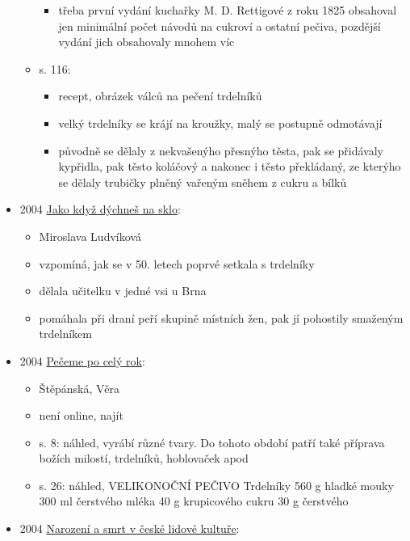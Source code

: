 \begin{itemize}
\begin{itemize}
    \begin{itemize}
    \tightlist
    \item
      třeba první vydání kuchařky M. D. Rettigové z roku 1825 obsahoval
      jen minimální počet návodů na cukroví a ostatní pečiva, pozdější
      vydání jich obsahovaly mnohem víc
    \end{itemize}
  \item
    s. 116:

    \begin{itemize}
    \tightlist
    \item
      recept, obrázek válců na pečení trdelníků
    \item
      velký trdelníky se krájí na kroužky, malý se postupně odmotávají
    \item
      původně se dělaly z nekvašenýho přesnýho těsta, pak se přidávaly
      kypřidla, pak těsto koláčový a nakonec i těsto překládaný, ze
      kterýho se dělaly trubičky plněný vařeným sněhem z cukru a bílků
    \end{itemize}
  \end{itemize}
\item
  2004
  \href{https://ceskadigitalniknihovna.cz/uuid/uuid:8ad90ef0-1c91-11ed-bb16-005056827e52}{Jako
  když dýchneš na sklo}:

  \begin{itemize}
  \tightlist
  \item
    Miroslava Ludvíková
  \item
    vzpomíná, jak se v 50. letech poprvé setkala s trdelníky
  \item
    dělala učitelku v jedné vsi u Brna
  \item
    pomáhala při draní peří skupině místních žen, pak jí pohostily
    smaženým trdelníkem
  \end{itemize}
\item
  2004
  \href{https://ceskadigitalniknihovna.cz/uuid/uuid:a088d120-1f29-11e6-8803-005056827e51}{Pečeme
  po celý rok}:

  \begin{itemize}
  \tightlist
  \item
    Štěpánská, Věra
  \item
    není online, najít
  \item
    s. 8: náhled, vyrábí různé tvary. Do tohoto období patří také
    příprava božích milostí, trdelníků, hoblovaček apod
  \item
    s. 26: náhled, VELIKONOČNÍ PEČIVO Trdelníky 560 g hladké mouky 300
    ml čerstvého mléka 40 g krupicového cukru 30 g čerstvého
  \end{itemize}
\item
  2004
  \href{https://ceskadigitalniknihovna.cz/uuid/uuid:6544a590-d474-11e4-8565-005056827e52}{Narození
  a smrt v české lidové kultuře}:


\end{itemize}

